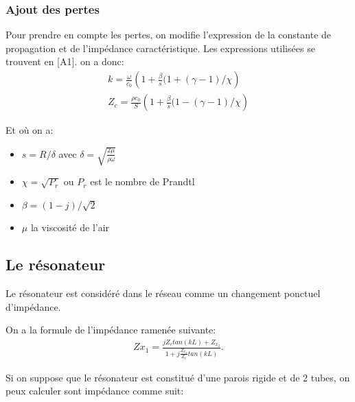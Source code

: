 \subsubsection{Ajout des pertes}

Pour prendre en compte les pertes, on modifie l'expression de la constante de propagation et de l'impédance caractéristique. Les expressions utilisées se trouvent en [A1]. on a donc:
\begin{eqnarray*}
 k =  \frac{\omega}{c_0} \left( 1 + \frac{\beta}{s}(1+(\gamma-1)/ \chi \right) \\
 Z_c =  \frac{\rho c_0}{S} \left( 1 + \frac{\beta}{s}(1-(\gamma-1)/ \chi \right) 
\end{eqnarray*}

Et où on a:
\begin{itemize}
 \item  $s=R/ \delta$ avec $\delta = \sqrt{\frac{2 \mu}{\rho \omega}}$
 \item  $\chi = \sqrt{P_r}$ ou $P_r$ est le nombre de Prandtl
 \item $\beta = (1-j)/\sqrt{2}$ 
 \item $\mu$ la viscosité de l'air
\end{itemize}



\subsection{Le résonateur}
Le résonateur est considéré dans le réseau comme un changement ponctuel d'impédance.

On a la formule de l'impédance ramenée suivante:
\begin{eqnarray}
Z{x_1}=\frac{jZ_c tan(kL)+Z_{x_2}}{1+j\frac{Z_{x_2}}{Z_c}tan(kL)}.
\end{eqnarray}

Si on suppose que le résonateur est constitué d'une parois rigide et de 2 tubes, on peux calculer sont impédance comme suit:

